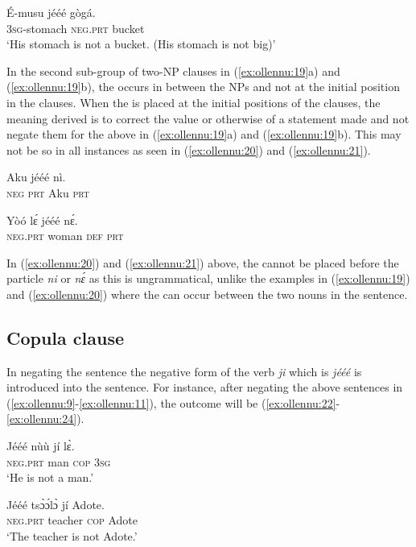 \documentclass[output=paper,newtxmath,modfonts,nonflat,draftmode]{langsci/langscibook}
\begin{document}
\ea \label{ex:ollennu:51}
\gll É-musu jééé gògá.\\
3\textsc{sg}-stomach \textsc{neg}.\textsc{prt} bucket\\
\glt 	`His stomach is not a bucket. (His stomach is not big)'
\z


In the second sub-group of two-NP clauses in (\ref{ex:ollennu:19}a) and (\ref{ex:ollennu:19}b), the  occurs in between the NPs and not at the initial position in the clauses. When the  is placed at the initial positions of the clauses, the meaning derived is to correct the value or otherwise of a statement made and not negate them for the above in (\ref{ex:ollennu:19}a) and (\ref{ex:ollennu:19}b). This may not be so in all instances as seen in (\ref{ex:ollennu:20}) and (\ref{ex:ollennu:21}).

\ea \label{ex:ollennu:20}
\gll * Aku jééé nì. \\
{} \textsc{neg} \textsc{prt} Aku \textsc{prt}\\
\z

\ea \label{ex:ollennu:21}
\gll * Yòó l\'ɛ jééé n\'ɛ.\\
{} \textsc{neg}.\textsc{prt} woman \textsc{def} \textsc{prt}\\
\z


In (\ref{ex:ollennu:20}) and (\ref{ex:ollennu:21}) above, the  cannot be placed before the particle \textit{ni} or \textit{n\'ɛ} as this is ungrammatical, unlike the examples in (\ref{ex:ollennu:19}) and (\ref{ex:ollennu:20}) where the  can occur between the two nouns in the sentence.

\subsection{\label{sec:ollennu:2.2} Copula clause}

In negating the  sentence the negative form of the  verb \textit{ji} which is \textit{jééé} is introduced into the sentence. For instance, after negating the above  sentences in (\ref{ex:ollennu:9}-\ref{ex:ollennu:11}), the outcome will be (\ref{ex:ollennu:22}-\ref{ex:ollennu:24}).

\ea \label{ex:ollennu:22}
\gll Jééé nùù jí l\`ɛ.\\
\textsc{neg}.\textsc{prt} man \textsc{cop} 3\textsc{sg}\\
\glt `He is not a man.'
\z

\ea \label{ex:ollennu:23}
\gll Jééé ts\`ɔ\'ɔl\`ɔ jí Adote.\\
\textsc{neg}.\textsc{prt} teacher \textsc{cop} Adote\\
\glt `The teacher is not Adote.'
\z
\end{document}
